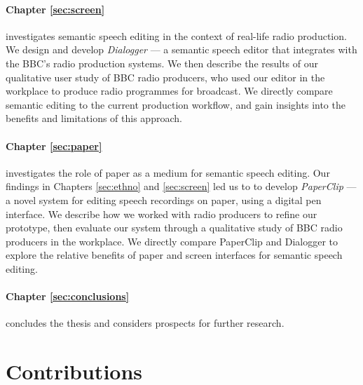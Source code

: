 \paragraph{Chapter \ref{sec:screen}} investigates semantic speech editing in the context of real-life radio production.
We design and develop \textit{Dialogger} --- a semantic speech editor that integrates with the BBC's radio production
systems.  We then describe the results of our qualitative user study of BBC radio producers, who used our editor in the
workplace to produce radio programmes for broadcast.  We directly compare semantic editing to the current production
workflow, and gain insights into the benefits and limitations of this approach.

\paragraph{Chapter \ref{sec:paper}} investigates the role of paper as a medium for semantic speech editing.  Our
findings in Chapters \ref{sec:ethno} and \ref{sec:screen} led us to to develop \textit{PaperClip} --- a novel system
for editing speech recordings on paper, using a digital pen interface. We describe how we worked with radio producers
to refine our prototype, then evaluate our system through a qualitative study of BBC radio producers in the workplace.
We directly compare PaperClip and Dialogger to explore the relative benefits of paper and screen interfaces for
semantic speech editing.

\paragraph{Chapter \ref{sec:conclusions}} concludes the thesis and considers prospects for further research.

\section{Contributions}\label{sec:intro-contributions}




